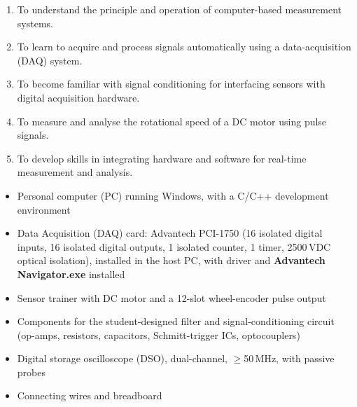 
\begin{objectives}
  \begin{enumerate}
    \item To understand the principle and operation of computer-based measurement systems.
    \item To learn to acquire and process signals automatically using a data-acquisition (DAQ) system.
    \item To become familiar with signal conditioning for interfacing sensors with digital acquisition hardware.
    \item To measure and analyse the rotational speed of a DC motor using pulse signals.
    \item To develop skills in integrating hardware and software for real-time measurement and analysis.
  \end{enumerate}
\end{objectives}

\begin{equipment}
  \begin{itemize}
    \item Personal computer (PC) running Windows, with a C/C++ development environment
    \item Data Acquisition (DAQ) card: Advantech PCI-1750 (16 isolated digital inputs, 16 isolated digital outputs, 1 isolated counter, 1 timer, 2500\,VDC optical isolation), installed in the host PC, with driver and \textbf{Advantech Navigator.exe} installed
    \item Sensor trainer with DC motor and a 12-slot wheel-encoder pulse output
    \item Components for the student-designed filter and signal-conditioning circuit (op-amps, resistors, capacitors, Schmitt-trigger ICs, optocouplers)
    \item Digital storage oscilloscope (DSO), dual-channel, $\geq$50\,MHz, with passive probes
    \item Connecting wires and breadboard
  \end{itemize}
\end{equipment}

